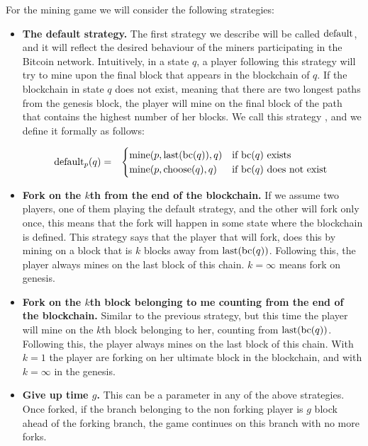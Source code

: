 \documentclass{article}
\begin{document}
For the mining game we will consider the following strategies:
\begin{itemize}
\item {\bf The default strategy.}  The first strategy we describe will be called $\text{default}$, and it will reflect the desired behaviour of the miners participating in the Bitcoin network. Intuitively, in a state $q$, a player following this strategy will try to mine upon the final block that appears in the blockchain of $q$. If the blockchain in state $q$ does not exist, meaning that there are two longest paths from the genesis block, the player will mine on the final block of the path that contains the highest number of her blocks. We call this strategy \df, and we define it formally as follows:

\begin{eqnarray*}
\text{default}_p(q) & = &
\begin{cases}
\text{mine}(p,\text{last}(\text{bc}(q)),q) & \text{if } \text{bc}(q) \text{ exists }\\
\text{mine}(p,\text{choose}(q),q) & \text{if } \text{bc}(q) \text{ does not exist }
\end{cases}
\end{eqnarray*}


\item {\bf Fork on the $k$th from the end of the blockchain.} If we assume two players, one of them playing the default strategy, and the other will fork only once, this means that the fork will happen in some state where the blockchain is defined. This strategy says that the player that will fork, does this by mining on a block that is $k$ blocks away from $\text{last}(\text{bc}(q))$. Following this, the player always mines on the last block of this chain. $k=\infty$ means fork on genesis. 

\item {\bf Fork on the $k$th block belonging to me counting from the end of the blockchain.} Similar to the previous strategy, but this time the player will mine on the $k$th block belonging to her, counting from $\text{last}(\text{bc}(q))$. Following this, the player always mines on the last block of this chain. With $k=1$ the player are forking on her ultimate block in the blockchain, and with $k=\infty$ in the genesis.

\item {\bf Give up time $g$.} This can be a parameter in any of the above strategies. Once forked, if the branch belonging to the non forking player is $g$ block ahead of the forking branch, the game continues on this branch with no more forks.
\end{itemize}
\end{document}
